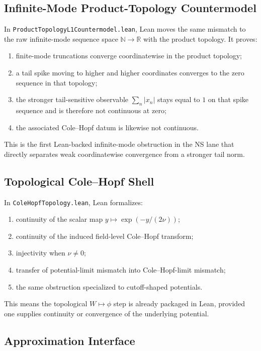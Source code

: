 \documentclass[11pt]{article}
\begin{document}
\subsection{Infinite-Mode Product-Topology Countermodel}

In \texttt{ProductTopologyL1Countermodel.lean}, Lean moves the same mismatch to
the raw infinite-mode sequence space \(\mathbb{N}\to\mathbb{R}\) with the
product topology.  It proves:
\begin{enumerate}[leftmargin=1.5em]
  \item finite-mode truncations converge coordinatewise in the product
  topology;
  \item a tail spike moving to higher and higher coordinates converges to the
  zero sequence in that topology;
  \item the stronger tail-sensitive observable
  \(\sum_n |x_n|\) stays equal to \(1\) on that spike sequence and is therefore
  not continuous at zero;
  \item the associated Cole--Hopf datum is likewise not continuous.
\end{enumerate}

This is the first Lean-backed infinite-mode obstruction in the NS lane that
directly separates weak coordinatewise convergence from a stronger tail norm.

\subsection{Topological Cole--Hopf Shell}

In \texttt{ColeHopfTopology.lean}, Lean formalizes:
\begin{enumerate}[leftmargin=1.5em]
  \item continuity of the scalar map \(y \mapsto \exp(-y/(2\nu))\);
  \item continuity of the induced field-level Cole--Hopf transform;
  \item injectivity when \(\nu \neq 0\);
  \item transfer of potential-limit mismatch into Cole--Hopf-limit mismatch;
  \item the same obstruction specialized to cutoff-shaped potentials.
\end{enumerate}

This means the topological \(W \mapsto \phi\) step is already packaged in Lean,
provided one supplies continuity or convergence of the underlying potential.

\subsection{Approximation Interface}
\end{document}
